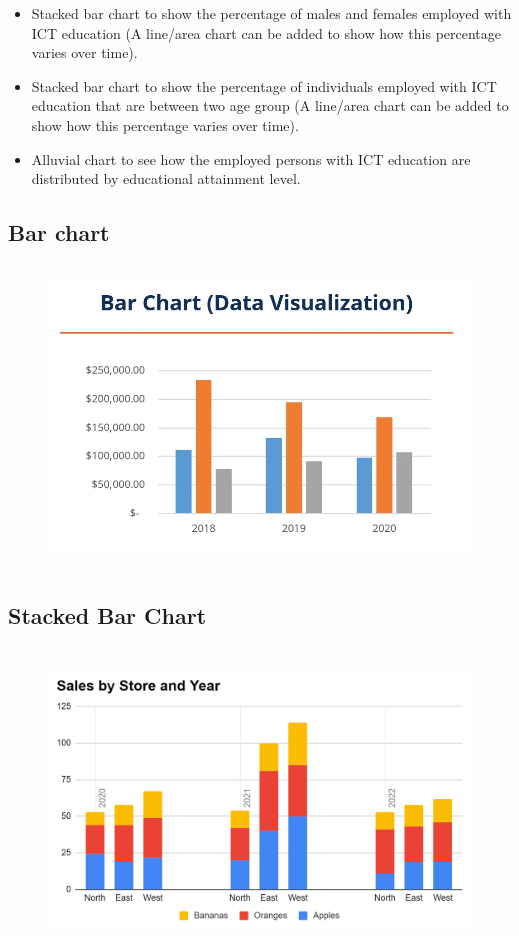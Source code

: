 \documentclass[12pt]{article}
\begin{document}
\begin{enumerate}
\begin{itemize}
              \item Stacked bar chart to show the percentage of males and females employed with ICT education (A line/area chart
                    can be added to show how this percentage varies over time).
              \item Stacked bar chart to show the percentage of individuals employed with ICT education that are between two age
                    group (A line/area chart can be added to show how this percentage varies over time).
              \item Alluvial chart to see how the employed persons with ICT education are distributed by educational attainment level.
          \end{itemize}
\end{enumerate}
\newpage

\subsection*{Bar chart}
\begin{figure}[h]
    \centering
    \includegraphics[width=12cm, height=8cm]{bar-charts.png}
    \centering
\end{figure}

\subsection*{Stacked Bar Chart}
\begin{figure}[h]
    \centering
    \includegraphics[width=12cm, height=8cm]{clusterstack1.png}
    \centering
\end{figure}
\end{document}
